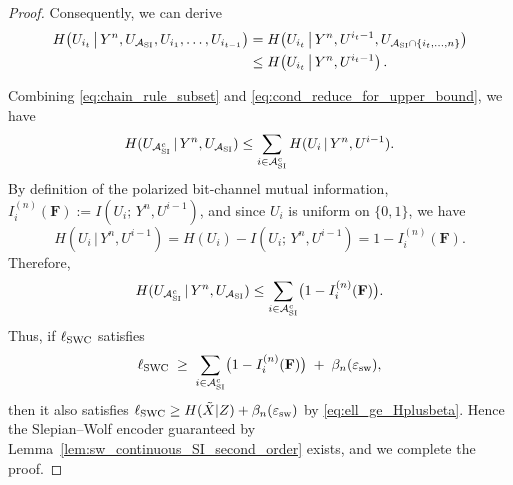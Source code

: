 \documentclass[onecolumn]{IEEEtran} %
\newcommand{\bF}{\mathbf F}
\newcommand{\1}{\mathbbm{1}}
\theoremstyle{boldremark}
\begin{document}
\begin{proof}
Consequently, we can derive 
\begin{align}
  H\!\left(
    U_{i_t}\,\middle|\,
    Y^n, U_{\mathcal{A}_{\rm SI}}, U_{i_1},\ldots,U_{i_{t-1}}
  \right)
  &=
  H\!\left(
    U_{i_t}\,\middle|\,
    Y^n, U^{i_t-1}, U_{\mathcal{A}_{\rm SI}\cap\{i_t,\ldots,n\}}
  \right) \notag\\
  &\le
  H\!\left(U_{i_t}\,\middle|\,Y^n,U^{i_t-1}\right).
  \label{eq:cond_reduce_for_upper_bound}
\end{align}

Combining \eqref{eq:chain_rule_subset} and \eqref{eq:cond_reduce_for_upper_bound}, we have
\[
  H(U_{\mathcal{A}_{\rm SI}^c}\,|\,Y^n,U_{\mathcal{A}_{\rm SI}})
  \leq \sum_{i\in\mathcal{A}_{\rm SI}^c} H(U_i\,|\,Y^n,U^{i-1}).
\]
By definition of the polarized bit-channel mutual information, $I_i^{(n)}(\bF):=I(U_i;\,Y^n,U^{i-1})$,
and since $U_i$ is uniform on $\{0,1\}$, we have
\[
  H(U_i\,|\,Y^n,U^{i-1})
  =
  H(U_i) - I(U_i;\,Y^n,U^{i-1})
  =
  1 - I_i^{(n)}(\bF).
\]
Therefore,
\[
   H(U_{\mathcal{A}_{\rm SI}^c}\,|\,Y^n,U_{\mathcal{A}_{\rm SI}})
  \leq \sum_{i\in\mathcal{A}_{\rm SI}^c}\bigl(1-I_i^{(n)}(\bF)\bigr).
\]
Thus, if $\ell_{\rm SWC}$ satisfies
\[
  \ell_{\rm SWC}
  \;\ge\;
  \sum_{i\in\mathcal{A}_{\rm SI}^c}\bigl(1-I_i^{(n)}(\bF)\bigr)
  \;+\;
  \beta_n(\varepsilon_{\rm sw}),
\]
then it also satisfies $\ell_{\rm SWC}\ge H(\tilde{X}|Z)+\beta_n(\varepsilon_{\rm sw})$ by \eqref{eq:ell_ge_Hplusbeta}.
Hence the Slepian--Wolf encoder guaranteed by Lemma~\ref{lem:sw_continuous_SI_second_order} exists, and we complete the proof.
\end{proof}
\end{document}
